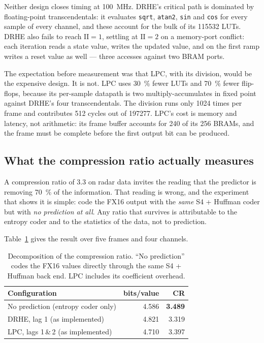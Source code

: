 \documentclass[10pt,twocolumn]{article}
\begin{document}
Neither design closes timing at \SI{100}{\mega\hertz}. DRHE's critical path is
dominated by floating-point transcendentals: it evaluates \texttt{sqrt},
\texttt{atan2}, \texttt{sin} and \texttt{cos} for every sample of every channel,
and these account for the bulk of its \num{115532} LUTs. DRHE also fails to
reach $\mathrm{II}=1$, settling at $\mathrm{II}=2$ on a memory-port conflict:
each iteration reads a state value, writes the updated value, and on the first
ramp writes a reset value as well --- three accesses against two BRAM ports.

The expectation before measurement was that LPC, with its division, would be
the expensive design. It is not. LPC uses \SI{30}{\percent} fewer LUTs and
\SI{70}{\percent} fewer flip-flops, because its per-sample datapath is two
multiply-accumulates in fixed point against DRHE's four transcendentals. The
division runs only \num{1024} times per frame and contributes \num{512} cycles
out of \num{197277}. LPC's cost is memory and latency, not arithmetic: its
frame buffer accounts for \num{240} of its \num{256} BRAMs, and the frame must
be complete before the first output bit can be produced.

\subsection{What the compression ratio actually measures}
\label{sec:decomp}

A compression ratio of \num{3.3} on radar data invites the reading that the
predictor is removing \SI{70}{\percent} of the information. That reading is
wrong, and the experiment that shows it is simple: code the FX16 output with
the \emph{same} S4 + Huffman coder but with \emph{no prediction at all}. Any
ratio that survives is attributable to the entropy coder and to the statistics
of the data, not to prediction.

Table~\ref{tab:decomp} gives the result over five frames and four channels.

\begin{table}[t]
\centering
\caption{Decomposition of the compression ratio. ``No prediction'' codes the
FX16 values directly through the same S4 + Huffman back end. LPC includes its
coefficient overhead.}
\label{tab:decomp}
\small
\begin{tabular}{lrr}
\toprule
Configuration & bits/value & CR\\
\midrule
No prediction (entropy coder only) & 4.586 & \textbf{3.489}\\
DRHE, lag 1 (as implemented)       & 4.821 & 3.319\\
LPC, lags 1\,\&\,2 (as implemented)& 4.710 & 3.397\\
\bottomrule
\end{tabular}
\end{table}
\end{document}
